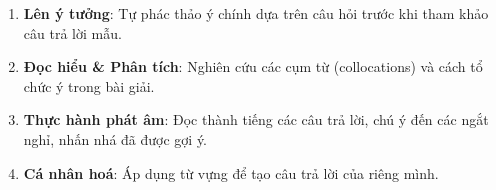 \begin{prompt}[title={Cách tiếp cận bài học}]
  \begin{enumerate}[leftmargin=2em, itemsep=4pt]
    \item \textbf{Lên ý tưởng}: Tự phác thảo ý chính dựa trên câu hỏi trước khi tham khảo câu trả lời mẫu.
    \item \textbf{Đọc hiểu \& Phân tích}: Nghiên cứu các cụm từ (collocations) và cách tổ chức ý trong bài giải.
    \item \textbf{Thực hành phát âm}: Đọc thành tiếng các câu trả lời, chú ý đến các ngắt nghỉ, nhấn nhá đã được gợi ý.
    \item \textbf{Cá nhân hoá}: Áp dụng từ vựng để tạo câu trả lời của riêng mình.
  \end{enumerate}
\end{prompt}
